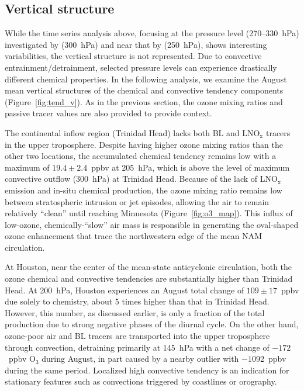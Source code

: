 \subsection{Vertical structure}

While the time series analysis above, focusing at the pressure level (270--330~hPa) investigated by \citet{Li:2005ss}
(300~hPa) and near that by \citet{Cooper:2007cr} (250~hPa), shows interesting variabilities,
the vertical structure is not represented. Due to convective entrainment/detrainment, selected
pressure levels can experience drastically different chemical properties. In the following
analysis, we examine the August mean vertical structures of the chemical and convective
tendency components (Figure~\ref{fig:tend_v}). As in the previous section, the ozone
mixing ratios and passive tracer values are also provided to provide context.

The continental inflow region (Trinidad Head) lacks both BL and LNO$_{\mathrm{x}}$
tracers in the upper troposphere. Despite having higher ozone mixing ratios than the
other two locations, the accumulated chemical tendency remains low with a maximum of
$19.4\pm2.4$~ppbv at 205~hPa, which is above the level of maximum
convective outflow (300~hPa) at Trinidad Head. Because of the lack of
LNO$_{\mathrm{x}}$ emission and  in-situ chemical production,
the ozone mixing ratio remains low between stratospheric intrusion or jet episodes, allowing
the air to remain relatively ``clean'' until reaching Minnesota (Figure~\ref{fig:o3_map}). This influx of low-ozone, 
chemically-``slow'' air mass is responsible in generating the oval-shaped ozone
enhancement that trace the northwestern edge of the mean NAM circulation.

At Houston, near the center of the mean-state anticyclonic circulation, both the ozone
chemical and convective tendencies are substantially higher than Trinidad Head. At
200~hPa, Houston experiences an August total change of $109\pm17$~ppbv due
solely to chemistry, about 5 times higher than that in Trinidad Head. However, this
number, as discussed earlier, is only a fraction of the total production due to strong negative phases of the
diurnal cycle. On the other hand, ozone-poor air and BL tracers are transported into
the upper troposphere through convection, detraining primarily at 145~hPa with a
net change of $-172$~ppbv O$_3$ during August, in part caused by a nearby outlier
with $-1092$~ppbv during the same period. Localized high convective tendency is
an indication for stationary features such as convections triggered by coastlines
or orography.

